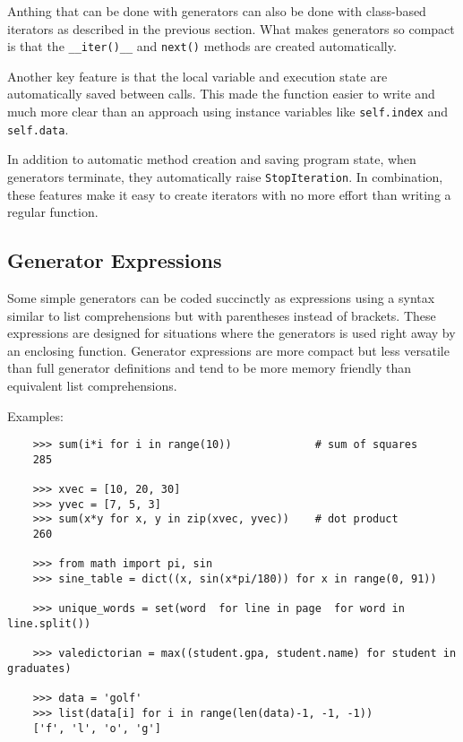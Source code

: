 \documentclass[UTF8]{article}
\begin{document}
Anthing that can be done with generators can also be done with class-based iterators as described
in the previous section. What makes generators so compact is that the \texttt{\_\_iter()\_\_} and
\texttt{next()} methods are created automatically.

Another key feature is that the local variable and execution state are automatically saved between
calls. This made the function easier to write and much more clear than an approach using instance
variables like \texttt{self.index} and \texttt{self.data}.

In addition to automatic method creation and saving program state, when generators terminate, they
automatically raise \texttt{StopIteration}. In combination, these features make it easy to create
iterators with no more effort than writing a regular function.

\subsection{Generator Expressions}
Some simple generators can be coded succinctly as expressions using a syntax similar to list
comprehensions but with parentheses instead of brackets. These expressions are designed for
situations where the generators is used right away by an enclosing function. Generator expressions
are more compact but less versatile than full generator definitions and tend to be more memory
friendly than equivalent list comprehensions.

Examples:
\begin{verbatim}
    >>> sum(i*i for i in range(10))             # sum of squares
    285

    >>> xvec = [10, 20, 30]
    >>> yvec = [7, 5, 3]
    >>> sum(x*y for x, y in zip(xvec, yvec))    # dot product
    260

    >>> from math import pi, sin
    >>> sine_table = dict((x, sin(x*pi/180)) for x in range(0, 91))

    >>> unique_words = set(word  for line in page  for word in line.split())

    >>> valedictorian = max((student.gpa, student.name) for student in graduates)

    >>> data = 'golf'
    >>> list(data[i] for i in range(len(data)-1, -1, -1))
    ['f', 'l', 'o', 'g']
\end{verbatim}
\end{document}
